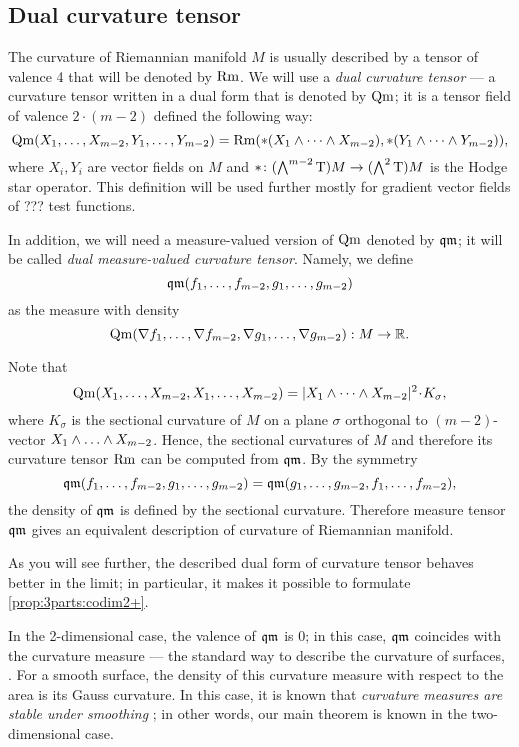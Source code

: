 \subsection{Dual curvature tensor}

The curvature of Riemannian manifold $M$ is usually described by a tensor of valence 4 that will be denoted by $\operatorname{\rm Rm}$.
We will use a \emph{dual curvature tensor} --- 
a curvature tensor written in a dual form that is denoted by $\operatorname{\rm Qm}$;
it is a tensor field of valence $2\cdot(m-2)$ defined the following way:
\[
\operatorname{\rm Qm}(X_1,\dots,X_{m-2},Y_1,\dots,Y_{m-2})
= 
\operatorname{\rm Rm}(*(X_1\wedge\dots\wedge X_{m-2}),*(Y_1\wedge\dots\wedge Y_{m-2})),
\]
where $X_i,Y_i$ are vector fields on $M$ and  ${*}\colon(\bigwedge^{m-2}\mathrm{T})M\to(\bigwedge^2\mathrm{T})M$ is the  Hodge star operator.
{\color{blue}
This definition will be used further mostly for gradient vector fields of ??? test functions.}

In addition, we will need a measure-valued version of $\operatorname{\rm Qm}$ denoted by $\operatorname{\mathfrak{qm}}$;
it will be called \emph{dual measure-valued curvature tensor}.
Namely, we define 
\[\qm(f_1,\zz\dots,f_{m-2},g_1,\zz\dots,g_{m-2})\]
as the measure with density
\[\operatorname{\rm Qm}(\nabla f_1,\dots,\nabla f_{m-2},\nabla g_1,\dots,\nabla g_{m-2}): M\to\mathbb{R}.\]

Note that 
$$\Qm(X_1,\dots,X_{m-2},X_1,\dots,X_{m-2})
=
|X_1\wedge\dots \wedge X_{m-2}|^2\cdot K_\sigma, $$
where $K_\sigma$ is the sectional curvature of $M$ 
on a plane $\sigma$ orthogonal to $(m-2)$-vector
$X_1\wedge\zz\dots \wedge X_{m-2}$.
Hence, the sectional curvatures of $M$ and therefore its curvature tensor $\operatorname{\rm Rm}$ can  be computed from
$\operatorname{\mathfrak{qm}}$.
By the symmetry
$$\operatorname{\mathfrak{qm}}(f_1,\dots,f_{m-2},g_1,\dots,g_{m-2})=
\operatorname{\mathfrak{qm}}(g_1,\dots,g_{m-2},f_1,\dots,f_{m-2}),$$
the density of $\operatorname{\mathfrak{qm}}$ is defined by the sectional curvature.
Therefore measure tensor $\operatorname{\mathfrak{qm}}$
gives an equivalent description of curvature of Riemannian manifold.

As you will see further, the described dual form of curvature tensor behaves better in the limit;
in particular, it makes it possible to formulate \ref{prop:3parts:codim2+}.

In the 2-dimensional case, the valence of $\operatorname{\mathfrak{qm}}$ is $0$;
in this case, $\operatorname{\mathfrak{qm}}$ coincides with the curvature measure --- the standard way to describe the curvature of surfaces, 
\cite{Resh,AZ}.
For a smooth surface, the density of this curvature measure with respect to the area
is its Gauss curvature.
In this case, it is known that \emph{curvature measures are stable under smoothing} \cite[VII \S13]{AZ};
in other words, our main theorem is known in the two-dimensional case.
